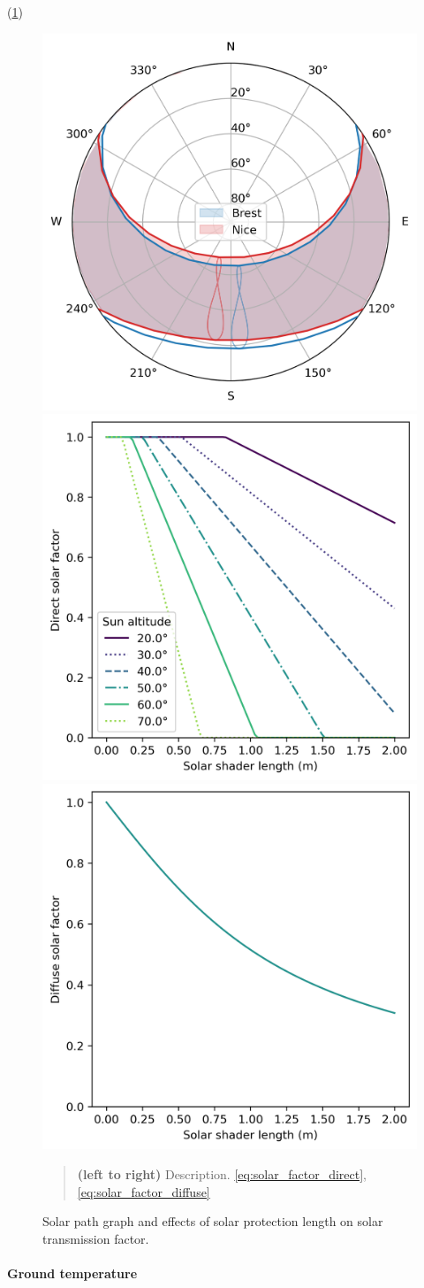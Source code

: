 \documentclass[11pt]{article}
\begin{document}
                (\ref{fig:solar_mask})

                \begin{figure}[ht]
                \centering
                \includegraphics[width=0.32\columnwidth]{figures/sun_path_Brest_Nice_2022.png}
                \includegraphics[width=0.32\columnwidth]{figures/direct_solar_factor_masking.png}
                \includegraphics[width=0.32\columnwidth]{figures/diffuse_solar_factor_masking.png}
                \caption{\label{fig:solar_mask} Solar path graph and effects of solar protection length on solar transmission factor.}
                    \begin{quote}
                        \vspace{-2mm}
                        \small\noindent
                        \textbf{(left to right)} Description. \eqref{eq:solar_factor_direct}, \eqref{eq:solar_factor_diffuse}
                    \end{quote}
                \end{figure}  
            

            \paragraph{Ground temperature} %
            \label{par:ground_temperature}
            
\end{document}
